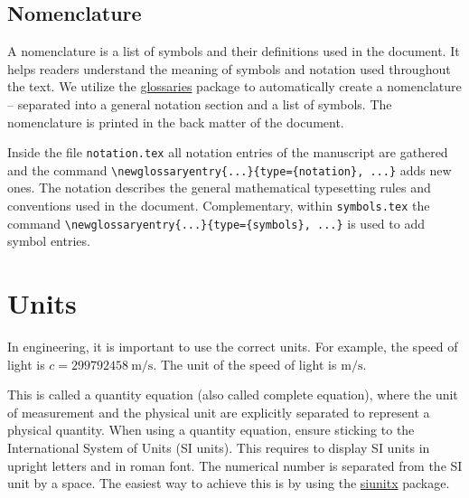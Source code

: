 \subsection{Nomenclature}
\label{subsec:nomenclature}
A nomenclature is a list of symbols and their definitions used in the document. It helps readers understand the meaning of symbols and notation used throughout the text. We utilize the \href{https://ctan.org/pkg/glossaries}{glossaries} package to automatically create a nomenclature -- separated into a general notation section and a list of symbols. The nomenclature is printed in the back matter of the document.  

\begin{infobox}
Inside the file \texttt{notation.tex} all notation entries of the manuscript are gathered and the command \verb|\newglossaryentry{...}{type={notation}, ...}| adds new ones. The notation describes the general mathematical typesetting rules and conventions used in the document. Complementary, within \texttt{symbols.tex} the command \verb|\newglossaryentry{...}{type={symbols}, ...}| is used to add symbol entries. 
\end{infobox}



 \section{Units}
 \label{sec:units}
 In engineering, it is important to use the correct units. For example, the speed of light is $c = \SI{299792458}{\meter\per\second}$. The unit of the speed of light is $\si{\meter\per\second}$.
 
 This is called a quantity equation (also called complete equation), where the unit of measurement and the physical unit are explicitly separated to represent a physical quantity. When using a quantity equation, ensure sticking to the International System of Units (SI units). This requires to display SI units in upright letters and in roman font. The numerical number is separated from the SI unit by a space. The easiest way to achieve this is by using the \href{https://ctan.org/pkg/siunitx}{siunitx} package.    
  

